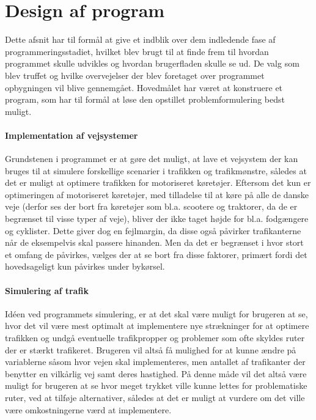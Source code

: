 \chapter{Design af program}
Dette afsnit har til formål at give et indblik over dem indledende fase af programmeringsstadiet, hvilket blev brugt til at finde frem til hvordan programmet skulle udvikles og hvordan brugerfladen skulle se ud. De valg som blev truffet og hvilke overvejelser der blev foretaget over programmet opbygningen vil blive gennemgået. Hovedmålet har været at konstruere et program, som har til formål at løse den opstillet problemformulering bedst muligt. 

\subsubsection{Implementation af vejsystemer}
Grundstenen i programmet er at gøre det muligt, at lave et vejsystem der kan bruges til at simulere forskellige scenarier i trafikken og trafikmønstre, således at det er muligt at optimere trafikken for motoriseret køretøjer. Eftersom det kun er optimeringen af motoriseret køretøjer, med tilladelse til at køre på alle de danske veje (derfor ses der bort fra køretøjer som bl.a. scootere og traktorer, da de er begrænset til visse typer af veje), bliver der ikke taget højde for bl.a. fodgængere og cyklister. Dette giver dog en fejlmargin, da disse også påvirker trafikanterne når de eksempelvis skal passere hinanden. Men da det er begrænset i hvor stort et omfang de påvirkes, vælges der at se bort fra disse faktorer, primært fordi det hovedsageligt kun påvirkes under bykørsel. 

\subsubsection{Simulering af trafik}
Idéen ved programmets simulering, er at det skal være muligt for brugeren at se, hvor det vil være mest optimalt at implementere nye strækninger for at optimere trafikken og undgå eventuelle trafikpropper og problemer som ofte skyldes ruter der er stærkt trafikeret. Brugeren vil altså få mulighed for at kunne ændre på variablerne såsom hvor vejen skal implementeres, men antallet af trafikanter der benytter en vilkårlig vej samt deres hastighed. På denne måde vil det altså være muligt for brugeren at se hvor meget trykket ville kunne lettes for problematiske ruter, ved at tilføje alternativer, således at det er muligt at vurdere om det ville være omkostningerne værd at implementere. 

